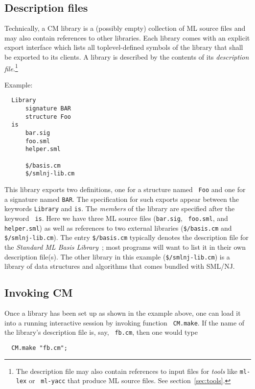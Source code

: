 \documentclass[titlepage,letterpaper]{article}
\begin{document}
\subsection{Description files}

Technically, a CM library is a (possibly empty) collection of ML
source files and may also contain references to other libraries.  Each
library comes with an explicit export interface which lists all
toplevel-defined symbols of the library that shall be exported to its
clients.  A library is described by the contents of its {\em
description file}.\footnote{The description file may also contain
references to input files for {\em tools} like {\tt ml-lex} or {\tt
ml-yacc} that produce ML source files.  See section~\ref{sec:tools}.}

\noindent Example:

\begin{verbatim}
  Library
      signature BAR
      structure Foo
  is
      bar.sig
      foo.sml
      helper.sml

      $/basis.cm
      $/smlnj-lib.cm
\end{verbatim}

This library exports two definitions, one for a structure named {\tt
Foo} and one for a signature named {\tt BAR}.  The specification for
such exports appear between the keywords {\tt Library} and {\tt is}.
The {\em members} of the library are specified after the keyword {\tt
is}.  Here we have three ML source files ({\tt bar.sig}, {\tt
foo.sml}, and {\tt helper.sml}) as well as references to two external
libraries ({\tt \$/basis.cm} and {\tt \$/smlnj-lib.cm}).  The entry
{\tt \$/basis.cm} typically denotes the description file for the {\it
Standard ML Basis Library}~\cite{reppy99:basis}; most programs will
want to list it in their own description file(s).  The other library
in this example ({\tt \$/smlnj-lib.cm}) is a library of data
structures and algorithms that comes bundled with SML/NJ.

\subsection{Invoking CM}

Once a library has been set up as shown in the example above, one can
load it into a running interactive session by invoking function {\tt
CM.make}.  If the name of the library's description file is, say, {\tt
fb.cm}, then one would type

\begin{verbatim}
  CM.make "fb.cm";
\end{verbatim}
\end{document}
